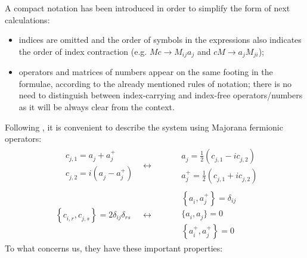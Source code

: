 \documentclass[a4paper,11pt]{article}
\theoremstyle{remark}
\newcommand{\ns}{\vskip 0.8cm}
\newcommand{\np}{\vskip 1.3cm}
\begin{document}
   A compact notation has been introduced in order to simplify the form of next calculations: 
   \begin{itemize}
   \item indices are omitted and the order of symbols in the expressions also indicates the order of index contraction (e.g. $Mc\rightarrow M_{ij}a_j$ and $cM \rightarrow a_j M_{ji}$);
   \item operators and matrices of numbers appear on the same footing in the formulae, according to the already mentioned rules of notation; there is no need to distinguish between index-carrying and index-free operators/numbers as it will be always clear from the context.
   \end{itemize}
   \ns
   Following \cite{Eisert2010}, it is convenient to describe the system using Majorana fermionic operators:
   \begin{subequations}
   \label{eq:def_majorana}
   \begin{align}
   &\begin{aligned}
    &c^{ }_{j, 1} = a_j^{ }+a_j^{+} \\
    &c^{ }_{j, 2} = i(a_j^{ }-a_j^{+})
   \end{aligned}
   &\longleftrightarrow&
   & &\begin{aligned}
    &a_j^{ }=\frac{1}{2}\left(c^{ }_{j, 1}-ic^{ }_{j, 2}\right)\\
    &a_j^+=\frac{1}{2}\left(c^{ }_{j, 1}+ic^{ }_{j, 2}\right)
   \end{aligned}\\[0.3 cm]
   &\left\{c^{ }_{i,r},c^{ }_{j,s}\right\} = 2\delta_{ij}\delta_{rs}
   &\longleftrightarrow&
   & &\begin{aligned}
    &\left\{a^{ }_{i},a^{+}_{j}\right\} = \delta_{ij} \\
    &\big\{a^{ }_{i},a^{ }_{j}\big\} = 0 \\
    &\left\{a^{+}_{i},a^{+}_{j}\right\} = 0 
    \end{aligned}
   \end{align}
   \end{subequations}\np
   To what concerns us, they have these important properties:
\end{document}
